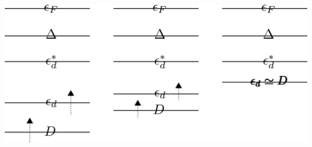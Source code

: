 \documentclass[14pt]{extarticle}
\numberwithin{equation}{section}
\begin{document}
{\begin{center}
\begin{minipage}{50pt}
\\\\
\end{minipage}
\hspace*{20pt}\il{\Longrightarrow}\hspace*{20pt}
\begin{minipage}{50pt}
\\\\
\end{minipage}
\hspace*{20pt}\il{\Longrightarrow}\hspace*{20pt}
\begin{minipage}{50pt}
\\\\
\end{minipage}
\hspace*{20pt}\il{\Longrightarrow}\hspace*{20pt}
\begin{minipage}{50pt}
\\\\
\end{minipage}
\end{center}
\begin{center}
	\includegraphics[scale=0.29]{empty.png}
\end{center}

}
\end{document}
